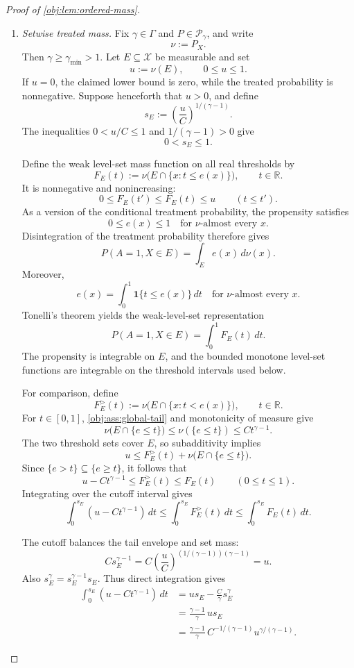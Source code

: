 \documentclass[11pt]{article}
\begin{document}
\begin{proof}[Proof of \cref{obj:lem:ordered-mass}]
\begin{enumerate}
\item \emph{Setwise treated mass.}
Fix \(\gamma\in\Gamma\) and \(P\in\mathcal P_\gamma\), and write
\[
\nu:=P_X.
\]
Then \(\gamma\ge\gamma_{\min}>1\). Let \(E\subseteq\mathcal X\) be measurable and set
\[
u:=\nu(E),
\qquad 0\le u\le1.
\]
If \(u=0\), the claimed lower bound is zero, while the treated probability is nonnegative. Suppose henceforth that \(u>0\), and define
\[
s_E:=\left(\frac uC\right)^{1/(\gamma-1)}.
\]
The inequalities \(0<u/C\le1\) and \(1/(\gamma-1)>0\) give
\[
0<s_E\le1.
\]

Define the weak level-set mass function on all real thresholds by
\[
F_E(t):=\nu\bigl(E\cap\{x:t\le e(x)\}\bigr),
\qquad t\in\mathbb R.
\]
It is nonnegative and nonincreasing:
\[
0\le F_E(t')\le F_E(t)\le u
\qquad(t\le t').
\]
As a version of the conditional treatment probability, the propensity satisfies
\[
0\le e(x)\le1
\quad\text{for }\nu\text{-almost every }x.
\]
Disintegration of the treatment probability therefore gives
\[
P(A=1,X\in E)=\int_E e(x)\,d\nu(x).
\]
Moreover,
\[
e(x)=\int_0^1\mathbf 1\{t\le e(x)\}\,dt
\quad\text{for }\nu\text{-almost every }x.
\]
Tonelli's theorem yields the weak-level-set representation
\[
P(A=1,X\in E)=\int_0^1F_E(t)\,dt.
\]
The propensity is integrable on \(E\), and the bounded monotone level-set functions are integrable on the threshold intervals used below.

For comparison, define
\[
F_E^{>}(t):=\nu\bigl(E\cap\{x:t<e(x)\}\bigr),
\qquad t\in\mathbb R.
\]
For \(t\in[0,1]\), \cref{obj:ass:global-tail} and monotonicity of measure give
\[
\nu\bigl(E\cap\{e\le t\}\bigr)
\le \nu(\{e\le t\})
\le Ct^{\gamma-1}.
\]
The two threshold sets cover \(E\), so subadditivity implies
\[
u\le F_E^{>}(t)+\nu\bigl(E\cap\{e\le t\}\bigr).
\]
Since \(\{e>t\}\subseteq\{e\ge t\}\), it follows that
\[
u-Ct^{\gamma-1}\le F_E^{>}(t)\le F_E(t)
\qquad(0\le t\le1).
\]
Integrating over the cutoff interval gives
\[
\int_0^{s_E}(u-Ct^{\gamma-1})\,dt
\le
\int_0^{s_E}F_E^{>}(t)\,dt
\le
\int_0^{s_E}F_E(t)\,dt.
\]

The cutoff balances the tail envelope and set mass:
\[
Cs_E^{\gamma-1}
=
C\left(\frac uC\right)^{(1/(\gamma-1))(\gamma-1)}
=u.
\]
Also \(s_E^\gamma=s_E^{\gamma-1}s_E\). Thus direct integration gives
\[
\begin{aligned}
\int_0^{s_E}(u-Ct^{\gamma-1})\,dt
&=us_E-\frac C\gamma s_E^\gamma\\
&=\frac{\gamma-1}{\gamma}\,us_E\\
&=\frac{\gamma-1}{\gamma}\,
C^{-1/(\gamma-1)}u^{\gamma/(\gamma-1)}.
\end{aligned}
\]


\end{enumerate}
\end{proof}
\end{document}
